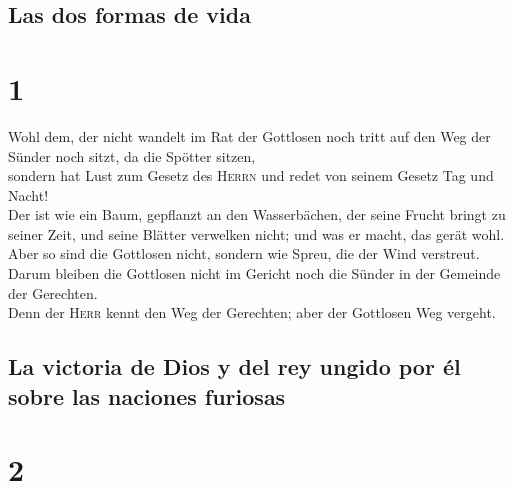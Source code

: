 \hypertarget{las-dos-formas-de-vida}{%
\subsection{Las dos formas de vida}\label{las-dos-formas-de-vida}}

\hypertarget{section}{%
\section{1}\label{section}}

 Wohl dem, der nicht wandelt im Rat der Gottlosen noch
tritt auf den Weg der Sünder noch sitzt, da die Spötter sitzen,\\
 sondern hat Lust zum Gesetz des \textsc{Herrn} und redet
von seinem Gesetz Tag und Nacht!\\
 Der ist wie ein Baum, gepflanzt an den Wasserbächen, der
seine Frucht bringt zu seiner Zeit, und seine Blätter verwelken nicht;
und was er macht, das gerät wohl.\\
 Aber so sind die Gottlosen nicht, sondern wie Spreu, die
der Wind verstreut.\\
 Darum bleiben die Gottlosen nicht im Gericht noch die
Sünder in der Gemeinde der Gerechten.\\
 Denn der \textsc{Herr} kennt den Weg der Gerechten; aber
der Gottlosen Weg vergeht.

\hypertarget{la-victoria-de-dios-y-del-rey-ungido-por-uxe9l-sobre-las-naciones-furiosas}{%
\subsection{La victoria de Dios y del rey ungido por él sobre las
naciones
furiosas}\label{la-victoria-de-dios-y-del-rey-ungido-por-uxe9l-sobre-las-naciones-furiosas}}

\hypertarget{section-1}{%
\section{2}\label{section-1}}

